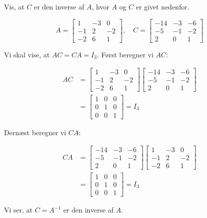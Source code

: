 \begin{example}
    Vis, at $C$ er den inverse af $A$, hvor $A$ og $C$ er givet nedenfor.

    \[
    A=\left[\begin{array}{rrr}
    1 & -3 & 0 \\
    -1 & 2 & -2 \\
    -2 & 6 & 1
    \end{array}\right], \quad C=\left[\begin{array}{rrr}
    -14 & -3 & -6 \\
    -5 & -1 & -2 \\
    2 & 0 & 1
    \end{array}\right]
    \]
    \label{ex:inverse2}
\end{example}

\begin{solution}
    Vi skal vise, at $A C = C A = I_3$. Først beregner vi $AC$:

    \[
    \begin{aligned}
    A C &=\left[\begin{array}{rrr}
    1 & -3 & 0 \\
    -1 & 2 & -2 \\
    -2 & 6 & 1
    \end{array}\right]\left[\begin{array}{rrr}
    -14 & -3 & -6 \\
    -5 & -1 & -2 \\
    2 & 0 & 1
    \end{array}\right] \\
    &=\left[\begin{array}{rrr}
    1 & 0 & 0 \\
    0 & 1 & 0 \\
    0 & 0 & 1
    \end{array}\right]=I_3
    \end{aligned}
    \]

    Dernæst beregner vi $CA$:

    \[
    \begin{aligned}
    C A &=\left[\begin{array}{rrr}
    -14 & -3 & -6 \\
    -5 & -1 & -2 \\
    2 & 0 & 1
    \end{array}\right]\left[\begin{array}{rrr}
    1 & -3 & 0 \\
    -1 & 2 & -2 \\
    -2 & 6 & 1
    \end{array}\right] \\
    &=\left[\begin{array}{rrr}
    1 & 0 & 0 \\
    0 & 1 & 0 \\
    0 & 0 & 1
    \end{array}\right]=I_3
    \end{aligned}
    \]

    Vi ser, at $C=A^{-1}$ er den inverse af $A$. \end{solution}

